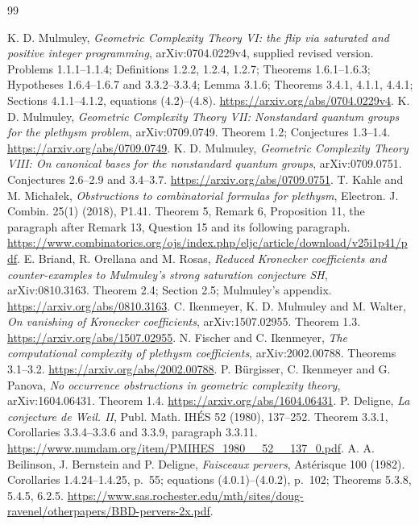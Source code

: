 \documentclass[11pt,a4paper]{article}
\begin{document}
\clearpage\begin{thebibliography}{99}

 K. D. Mulmuley, \emph{Geometric Complexity Theory VI: the flip via saturated and positive integer programming}, arXiv:0704.0229v4, supplied revised version. Problems 1.1.1--1.1.4; Definitions 1.2.2, 1.2.4, 1.2.7; Theorems 1.6.1--1.6.3; Hypotheses 1.6.4--1.6.7 and 3.3.2--3.3.4; Lemma 3.1.6; Theorems 3.4.1, 4.1.1, 4.4.1; Sections 4.1.1--4.1.2, equations (4.2)--(4.8). \url{https://arxiv.org/abs/0704.0229v4}.
 K. D. Mulmuley, \emph{Geometric Complexity Theory VII: Nonstandard quantum groups for the plethysm problem}, arXiv:0709.0749. Theorem 1.2; Conjectures 1.3--1.4. \url{https://arxiv.org/abs/0709.0749}.
 K. D. Mulmuley, \emph{Geometric Complexity Theory VIII: On canonical bases for the nonstandard quantum groups}, arXiv:0709.0751. Conjectures 2.6--2.9 and 3.4--3.7. \url{https://arxiv.org/abs/0709.0751}.
 T. Kahle and M. Micha\l ek, \emph{Obstructions to combinatorial formulas for plethysm}, Electron. J. Combin. 25(1) (2018), P1.41. Theorem 5, Remark 6, Proposition 11, the paragraph after Remark 13, Question 15 and its following paragraph. \url{https://www.combinatorics.org/ojs/index.php/eljc/article/download/v25i1p41/pdf}.
 E. Briand, R. Orellana and M. Rosas, \emph{Reduced Kronecker coefficients and counter-examples to Mulmuley's strong saturation conjecture SH}, arXiv:0810.3163. Theorem 2.4; Section 2.5; Mulmuley's appendix. \url{https://arxiv.org/abs/0810.3163}.
 C. Ikenmeyer, K. D. Mulmuley and M. Walter, \emph{On vanishing of Kronecker coefficients}, arXiv:1507.02955. Theorem 1.3. \url{https://arxiv.org/abs/1507.02955}.
 N. Fischer and C. Ikenmeyer, \emph{The computational complexity of plethysm coefficients}, arXiv:2002.00788. Theorems 3.1--3.2. \url{https://arxiv.org/abs/2002.00788}.
 P. B\"urgisser, C. Ikenmeyer and G. Panova, \emph{No occurrence obstructions in geometric complexity theory}, arXiv:1604.06431. Theorem 1.4. \url{https://arxiv.org/abs/1604.06431}.
 P. Deligne, \emph{La conjecture de Weil. II}, Publ. Math. IH\'ES 52 (1980), 137--252. Theorem 3.3.1, Corollaries 3.3.4--3.3.6 and 3.3.9, paragraph 3.3.11. \url{https://www.numdam.org/item/PMIHES_1980__52__137_0.pdf}.
 A. A. Beilinson, J. Bernstein and P. Deligne, \emph{Faisceaux pervers}, Ast\'erisque 100 (1982). Corollaries 1.4.24--1.4.25, p.~55; equations (4.0.1)--(4.0.2), p.~102; Theorems 5.3.8, 5.4.5, 6.2.5. \url{https://www.sas.rochester.edu/mth/sites/doug-ravenel/otherpapers/BBD-pervers-2x.pdf}.

\end{thebibliography}
\end{document}
